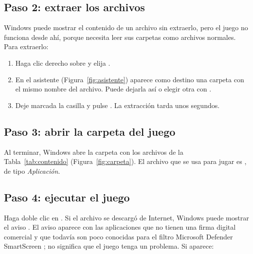\documentclass[stu,letterpaper,12pt,donotrepeattitle,floatsintext]{apa7}
\begin{document}
\subsection{Paso 2: extraer los archivos}

Windows puede mostrar el contenido de un archivo  sin extraerlo, pero el juego no funciona
desde ahí, porque necesita leer sus carpetas como archivos normales. Para extraerlo:

\begin{enumerate}
  \item Haga clic derecho sobre  y elija .
  \item En el asistente  (Figura~\ref{fig:asistente})
        aparece como destino una carpeta con el mismo nombre del archivo. Puede dejarla así o elegir
        otra con .
  \item Deje marcada la casilla  y pulse
        . La extracción tarda unos segundos.
\end{enumerate}


\subsection{Paso 3: abrir la carpeta del juego}

Al terminar, Windows abre la carpeta  con los archivos de la
Tabla~\ref{tab:contenido} (Figura~\ref{fig:carpeta}). El archivo que se usa para jugar es
, de tipo \textit{Aplicación}.


\subsection{Paso 4: ejecutar el juego}

Haga doble clic en . Si el archivo se descargó de Internet, Windows puede mostrar el
aviso . El aviso aparece con las aplicaciones que no tienen una
firma digital comercial y que todavía son poco conocidas para el filtro Microsoft Defender
SmartScreen \parencite{smartscreen}; no significa que el juego tenga un problema. Si aparece:
\end{document}
